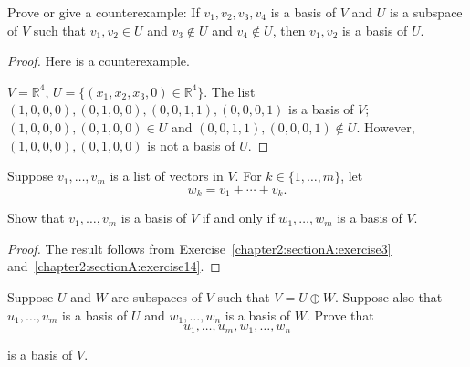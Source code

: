 \begin{exercise}
    Prove or give a counterexample: If $v_{1} , v_{2} , v_{3} , v_{4}$ is a basis of $V$ and $U$ is a subspace of $V$ such that $v_{1} , v_{2} \in U$ and $v_{3} \notin U$ and $v_{4} \notin U$, then $v_{1} , v_{2}$ is a basis of $U$.
\end{exercise}

\begin{proof}
    Here is a counterexample.

    $V = \mathbb{R}^{4}$, $U = \{ (x_{1}, x_{2}, x_{3}, 0)\in\mathbb{R}^{4} \}$. The list $(1, 0, 0, 0), (0, 1, 0, 0), (0, 0, 1, 1), (0, 0, 0, 1)$ is a basis of $V$; $(1, 0, 0, 0), (0, 1, 0, 0)\in U$ and $(0, 0, 1, 1), (0, 0, 0, 1)\notin U$. However, $(1, 0, 0, 0), (0, 1, 0, 0)$ is not a basis of $U$.
\end{proof}

\begin{exercise}
    Suppose $v_{1}, \ldots, v_{m}$ is a list of vectors in $V$. For $k\in\{ 1, \ldots, m \}$, let
    \[
        w_{k} = v_{1} + \cdots + v_{k}.
    \]

    Show that $v_{1}, \ldots, v_{m}$ is a basis of $V$ if and only if $w_{1}, \ldots, w_{m}$ is a basis of $V$.
\end{exercise}

\begin{proof}
    The result follows from Exercise~\ref{chapter2:sectionA:exercise3} and~\ref{chapter2:sectionA:exercise14}.
\end{proof}

\begin{exercise}
    Suppose $U$ and $W$ are subspaces of $V$ such that $V = U \oplus W$. Suppose also that $u_{1}, \ldots, u_{m}$ is a basis of $U$ and $w_{1}, \ldots, w_{n}$ is a basis of $W$. Prove that
    \[
        u_{1}, \ldots, u_{m}, w_{1}, \ldots, w_{n}
    \]

    is a basis of $V$.
\end{exercise}

